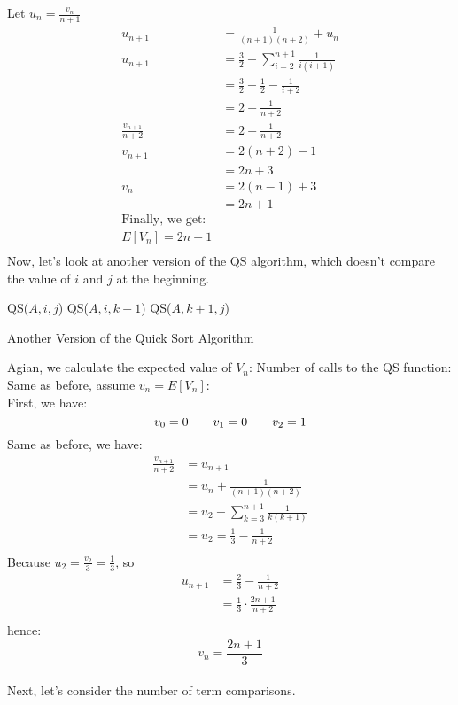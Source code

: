 \documentclass{article}
\begin{document}
Let $u_n=\frac{v_n}{n+1}$ \\
\begin{align*}
u_{n+1}&=\frac{1}{(n+1)(n+2)}+u_n \\
u_{n+1}&=\frac{3}{2}+\sum_{i=2}^{n+1}\frac{1}{i(i+1)} \\
&=\frac{3}{2}+\frac{1}{2}-\frac{1}{i+2} \\
&=2-\frac{1}{n+2}\\
\frac{v_{n+1}}{n+2}&=2-\frac{1}{n+2}\\
v_{n+1}&=2(n+2)-1\\
&=2n+3\\
v_n&=2(n-1)+3\\
&=2n+1\\
\text{Finally, we get:} \\
E[V_n]=2n+1\\
\end{align*}
Now, let's look at another version of the QS algorithm, which doesn't
compare the value of $i$ and $j$ at the beginning.\\
\begin{algorithm}[H]
QS($A,i,j$)\;
 {QS($A,i,k-1$)}
 {QS($A,k+1,j$)}
\caption{Another Version of the Quick Sort Algorithm}
\end{algorithm}
Agian, we calculate the expected value of $V_n$: Number of calls to
the QS function:\\
Same as before, assume $v_n=E[V_n]$:\\
First, we have:\\
\[
v_0=0\qquad v_1=0\qquad v_2=1 \\
\]
Same as before, we have: \\
\begin{align*}
\frac{v_{n+1}}{n+2}&=u_{n+1} \\
&=u_n+\frac{1}{(n+1)(n+2)} \\
&=u_2+\sum_{k=3}^{n+1}\frac{1}{k(k+1)}\\
&=u_2=\frac{1}{3}-\frac{1}{n+2}\\
\end{align*}
Because $u_2=\frac{v_2}{3}=\frac{1}{3}$, so \\
\begin{align*}
u_{n+1}&=\frac{2}{3}-\frac{1}{n+2} \\
&=\frac{1}{3}\cdot\frac{2n+1}{n+2} \\
\end{align*}
hence: \\
\[v_n=\frac{2n+1}{3}\]\\
Next, let's consider the number of term comparisons.\\
\end{document}

